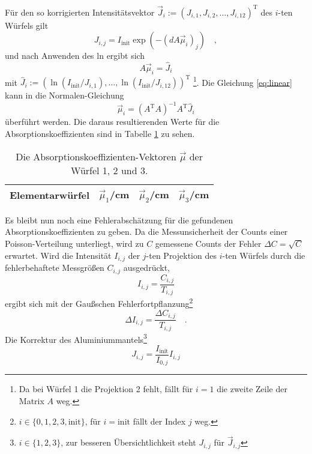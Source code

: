 Für den so korrigierten Intensitätsvektor $\vec{J}_i:=(J_{i,1},J_{i,2},\ldots,J_{i,12})^\text{T}$ 
des $i$-ten Würfels gilt
\begin{equation}
J_{i,j}=I_\text{init}\exp\left(- (d A \vec{\mu}_i)_j \right) \quad ,
\end{equation}
und nach Anwenden des ln ergibt sich
\begin{equation}
A \vec{\mu}_i = \hat{J}_i \label{eq:linear}
\end{equation}
mit $\hat{J}_i:=(\ln(I_\text{init}/J_{i,1}),\ldots,\ln(I_\text{init}/J_{i,12}))^\text{T}$ 
  \footnote{
Da bei Würfel 1 die Projektion 2 fehlt, fällt für $i=1$ die zweite Zeile der Matrix $A$ weg.}. 
Die Gleichung \eqref{eq:linear} kann in die Normalen-Gleichung
\begin{equation}
\vec{\mu}_i = \left( A^\text{T}A \right)^{-1} A^\text{T} \hat{J}_i \label{eq:linear2}
\end{equation}
überführt werden. Die daraus resultierenden Werte für die Absorptionskoeffizienten sind in 
Tabelle \ref{tab:Koeff} zu sehen.
\begin{table}[h]
\centering
\begin{tabular}{cccc}
\toprule
\midrule
Elementarwürfel & $\vec{\mu}_1$/cm & $\vec{\mu}_2$/cm & $\vec{\mu}_3$/cm \\
\midrule

\midrule
\bottomrule
\end{tabular}
\caption{Die Absorptionskoeffizienten-Vektoren $\vec{\mu}$ der Würfel 1, 2 und 3.}
\label{tab:Koeff}
\end{table}
\clearpage
Es bleibt nun noch eine Fehlerabschätzung für die gefundenen Absorptionskoeffizienten zu geben. 
Da die Messunsicherheit der Counts einer Poisson-Verteilung unterliegt, wird zu $C$ gemessene 
Counts der Fehler $\Delta C=\sqrt{C}$ erwartet.
Wird die Intensität $I_{i,j}$ der $j$-ten 
Projektion des $i$-ten Würfels durch die fehlerbehaftete Messgrößen $C_{i,j}$ ausgedrückt,
\begin{equation}
I_{i,j}=\frac{C_{i,j}}{T_{i,j}}
\end{equation}
ergibt sich mit der Gaußschen Fehlerfortpflanzung\footnote{$i\in \{0,1,2,3,\text{init}\}$, für 
$i=\text{init}$ fällt der Index $j$ weg.}
\begin{equation}
\Delta I_{i,j}=\frac{\Delta C_{i,j}}{T_{i,j}} \quad.
\end{equation}
Die Korrektur des Aluminiummantels\footnote{$i\in \{1,2,3\}$, zur besseren Übersichtlichkeit 
steht $J_{i,j}$ für $\vec{J}_{i,j}$}
\begin{equation}
J_{i,j}=\frac{I_\text{init}}{I_{0,j}} I_{i,j}
\end{equation}
